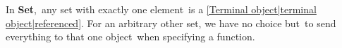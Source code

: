 
In \textbf{Set}, \,any set with exactly one element\, is a \ref{Terminal object|terminal object|referenced}. For an arbitrary other set, we have no choice but \,to send everything to that one object\, when specifying a function.

